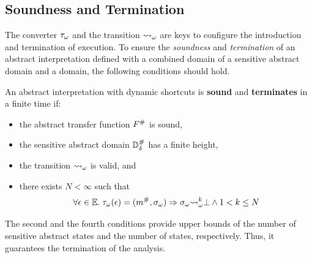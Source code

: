 \subsection{Soundness and Termination}
The converter ${\tau}_\omega$ and the {\sealed} transition ${\leadsto}_\omega$ are
keys to configure the introduction and termination of {\sealed}
execution.  To ensure the \textit{soundness} and \textit{termination} of an
abstract interpretation defined with a combined domain of a sensitive abstract
domain and a {\sealed} domain, the following conditions should hold.

\begin{theorem}\label{theorem:shortcut}
An abstract interpretation with dynamic shortcuts is \textbf{sound} and
\textbf{terminates} in a finite time if:
  \begin{itemize}
    \item the abstract transfer function ${F}^{\#}$ is sound,
    \item the sensitive abstract domain ${\mathbb{D}}^{\#}_\delta$ has a finite height,
    \item the {\sealed} transition ${\leadsto}_\omega$ is valid, and
    \item there exists $N < \infty$ such that
      \[
        \forall \epsilon \in \mathbb{E}. \; {\tau}_\omega(\epsilon) = ({m}^{\#},
        {\sigma}_\omega) \Rightarrow {\sigma}_\omega
        {\leadsto}_\omega^k \bot \wedge 1 < k \leq N
      \]
  \end{itemize}
\end{theorem}

The second and the fourth conditions provide upper bounds of
the number of sensitive abstract states and
the number of {\sealed} states, respectively.
Thus, it guarantees the termination of the analysis.

